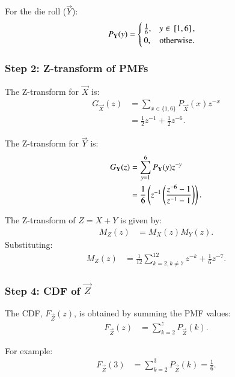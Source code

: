 \documentclass[journal]{IEEEtran}
\begin{document}
For the die roll ($\vec{Y}$):
\begin{align}
P_{\mathbf{Y}}(y) &= 
\begin{cases} 
\frac{1}{6}, & y \in {}\left[1,6\right], \\
0, & \text{otherwise}.
\end{cases}
\end{align}

\subsubsection*{Step 2: Z-transform of PMFs}
The Z-transform for $\vec{X}$ is:
\begin{align}
G_{\vec{X}}(z) &= \sum_{x \in \{1, 6\}} P_{\vec{X}}(x) z^{-x} \\
     &= \frac{1}{2} z^{-1} + \frac{1}{2} z^{-6}.
\end{align}

The Z-transform for $\vec{Y}$ is:
\begin{align}
G_{\mathbf{Y}}(z) &= \sum_{y=1}^{6} P_{\mathbf{Y}}(y) z^{-y} \\
     &= \frac{1}{6} \left(z^{-1}\left(\frac{z^{-6}-1}{z^{-1}-1}\right)\right).
\end{align}


The Z-transform of $Z = X + Y$ is given by:
\begin{align}
M_Z(z) &= M_X(z) M_Y(z).
\end{align}
Substituting:
\begin{align}
M_Z(z) &= \frac{1}{12} \sum_{k=2, k \neq 7}^{12} z^{-k} + \frac{1}{6} z^{-7}.
\end{align}

\subsubsection*{Step 4: CDF of $\vec{Z}$}
The CDF, $F_{\vec{Z}}(z)$, is obtained by summing the PMF values:
\begin{align}
F_{\vec{Z}}(z) &= \sum_{k=2}^{z} P_{\vec{Z}}(k).
\end{align}

For example:
\begin{align}
F_{\vec{Z}}(3) &= \sum_{k=2}^{3} P_{\vec{Z}}(k) = \frac{1}{6}.
\end{align}
\end{document}
